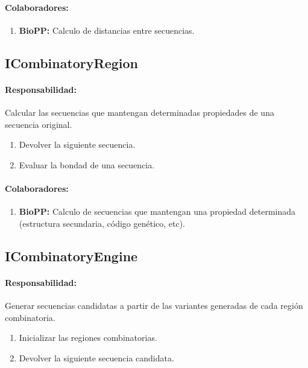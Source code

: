 \documentclass[a4paper,10pt]{article}
\begin{document}
    \paragraph{Colaboradores:}
      \begin{enumerate}
       \item \textbf{BioPP:} Calculo de distancias entre secuencias.
      \end{enumerate}

  \subsection{ICombinatoryRegion}
    \paragraph{Responsabilidad:} Calcular las secuencias que mantengan
determinadas propiedades de una secuencia original.    
      \begin{enumerate}
       \item Devolver la siguiente secuencia.
       \item Evaluar la bondad de una secuencia.
      \end{enumerate}
    \paragraph{Colaboradores:}
      \begin{enumerate}
       \item \textbf{BioPP:} Calculo de secuencias que mantengan una propiedad
determinada (estructura secundaria, c\'odigo gen\'etico, etc).
      \end{enumerate}

  \subsection{ICombinatoryEngine}
    \paragraph{Responsabilidad:} Generar secuencias candidatas a partir de las
variantes generadas de cada regi\'on combinatoria.       
      \begin{enumerate}       
       \item Inicializar las regiones combinatorias.
       \item Devolver la siguiente secuencia candidata.
      \end{enumerate}
\end{document}
